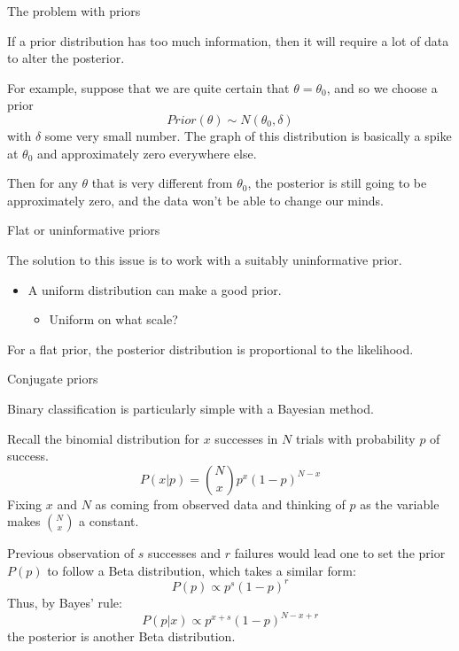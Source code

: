 \documentclass[
  ignorenonframetext,
]{beamer}
\providecommand{\tightlist}{%
  \setlength{\itemsep}{0pt}\setlength{\parskip}{0pt}}
\begin{document}
\begin{frame}{The problem with priors}
\protect\hypertarget{the-problem-with-priors}{}

If a prior distribution has too much information, then it will require a
lot of data to alter the posterior.

For example, suppose that we are quite certain that \(\theta=\theta_0\),
and so we choose a prior \[
Prior(\theta)\sim N(\theta_0,\delta) 
\] with \(\delta\) some very small number. The graph of this
distribution is basically a spike at \(\theta_0\) and approximately zero
everywhere else.

Then for any \(\theta\) that is very different from \(\theta_0\), the
posterior is still going to be approximately zero, and the data won't be
able to change our minds.

\end{frame}

\begin{frame}{Flat or uninformative priors}
\protect\hypertarget{flat-or-uninformative-priors}{}

The solution to this issue is to work with a suitably uninformative
prior.

\begin{itemize}
\tightlist
\item
  A uniform distribution can make a good prior.

  \begin{itemize}
  \tightlist
  \item
    Uniform on what scale?
  \end{itemize}
\end{itemize}

For a flat prior, the posterior distribution is proportional to the
likelihood.

\end{frame}

\begin{frame}{Conjugate priors}
\protect\hypertarget{conjugate-priors}{}

Binary classification is particularly simple with a Bayesian method.

Recall the binomial distribution for \(x\) successes in \(N\) trials
with probability \(p\) of success. \[
P(x|p) = {N\choose x} p^x(1-p)^{N-x}
\] Fixing \(x\) and \(N\) as coming from observed data and thinking of
\(p\) as the variable makes \(N\choose x\) a constant.

Previous observation of \(s\) successes and \(r\) failures would lead
one to set the prior \(P(p)\) to follow a Beta distribution, which takes
a similar form: \[
P(p)\propto p^s(1-p)^r
\] Thus, by Bayes' rule: \[
P(p|x) \propto p^{x+s}(1-p)^{N-x+r}
\] the posterior is another Beta distribution.

\end{frame}
\end{document}
